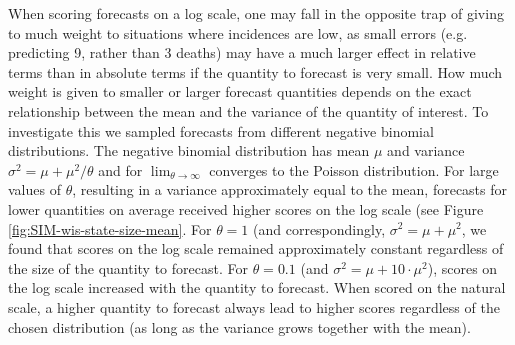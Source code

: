 \documentclass{article}
\begin{document}
When scoring forecasts on a log scale, one may fall in the opposite trap of giving to much weight to situations where incidences are low, as small errors (e.g. predicting 9, rather than 3 deaths) may have a much larger effect in relative terms than in absolute terms if the quantity to forecast is very small. How much weight is given to smaller or larger forecast quantities depends on the exact relationship between the mean and the variance of the quantity of interest. To investigate this we sampled forecasts from different negative binomial distributions. The negative binomial distribution has mean $\mu$ and variance $\sigma^2 = \mu + \mu ^2 / \theta$ and for $\lim_{\theta \to \infty}$ converges to the Poisson distribution. For large values of $\theta$, resulting in a variance approximately equal to the mean, forecasts for lower quantities on average received higher scores on the log scale (see Figure \ref{fig:SIM-wis-state-size-mean}. For $\theta = 1$ (and correspondingly, $\sigma^2 = \mu + \mu^2$, we found that scores on the log scale remained approximately constant regardless of the size of the quantity to forecast. For $\theta = 0.1$ (and $\sigma^2 = \mu + 10 \cdot \mu^2$), scores on the log scale increased with the quantity to forecast. When scored on the natural scale, a higher quantity to forecast always lead to higher scores regardless of the chosen distribution (as long as the variance grows together with the mean). 


\end{document}
